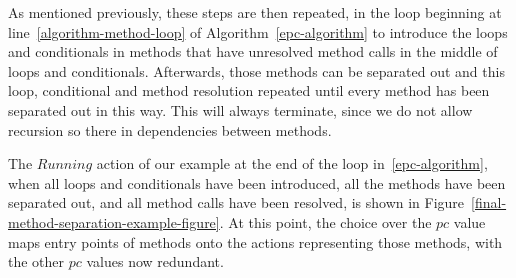  
As mentioned previously, these steps are then repeated, in the loop
beginning at line~\ref{algorithm-method-loop} of
Algorithm~\ref{epc-algorithm} to introduce the loops and conditionals
in methods that have unresolved method calls in the middle of loops
and conditionals.
Afterwards, those methods can be separated out and this loop,
conditional and method resolution repeated until every method has been
separated out in this way.
This will always terminate, since we do not allow recursion so there
in dependencies between methods.

The $Running$ action of our example at the end of the loop
in~\ref{epc-algorithm}, when all loops and conditionals have been
introduced, all the methods have been separated out, and all method
calls have been resolved, is shown in
Figure~\ref{final-method-separation-example-figure}.
At this point, the choice over the $pc$ value maps entry points of
methods onto the actions representing those methods, with the other
$pc$ values now redundant.

